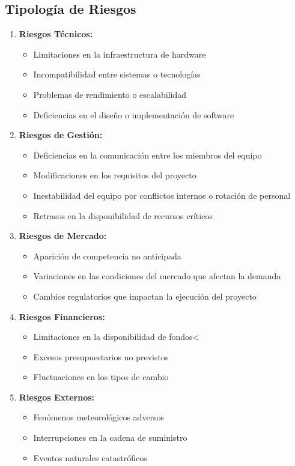 \subsection*{Tipología de Riesgos}
\begin{enumerate}
    \item \textbf{Riesgos Técnicos:}
    \begin{itemize}
        \item Limitaciones en la infraestructura de hardware
        \item Incompatibilidad entre sistemas o tecnologías
        \item Problemas de rendimiento o escalabilidad        
        \item Deficiencias en el diseño o implementación de software
    \end{itemize}
    
    \item \textbf{Riesgos de Gestión:}
    \begin{itemize}
        \item Deficiencias en la comunicación entre los miembros del equipo
        \item Modificaciones en los requisitos del proyecto        
        \item Inestabilidad del equipo por conflictos internos o rotación de personal
        \item Retrasos en la disponibilidad de recursos críticos

    \end{itemize}
    
    \item \textbf{Riesgos de Mercado:}
    \begin{itemize}
        \item Aparición de competencia no anticipada
        \item Variaciones en las condiciones del mercado que afectan la demanda
        \item Cambios regulatorios que impactan la ejecución del proyecto
    \end{itemize}
    
    \item \textbf{Riesgos Financieros:}
    \begin{itemize}
        \item Limitaciones en la disponibilidad de fondos<
        \item Excesos presupuestarios no previstos
        \item Fluctuaciones en los tipos de cambio
    \end{itemize}
    
    \item \textbf{Riesgos Externos:}
    \begin{itemize}
        \item Fenómenos meteorológicos adversos
        \item Interrupciones en la cadena de suministro
        \item Eventos naturales catastróficos
    \end{itemize}
\end{enumerate}


